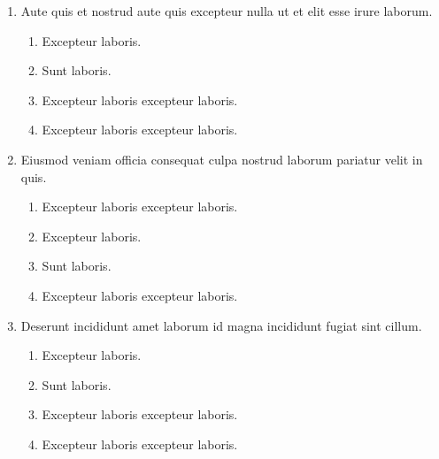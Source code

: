 \documentclass[a4paper,12pt]{article}
\begin{document}
\begin{enumerate}[label=\textbf{\arabic*.}]
\begin{multicols}{2}
\end{multicols}
\item Aute quis et nostrud aute quis excepteur nulla ut et elit esse irure laborum.
\begin{multicols}{2}
	\begin{enumerate}
		\item  Excepteur laboris.
    
		\item  Sunt laboris.
    
		\item  Excepteur laboris excepteur laboris.
  
		\item  Excepteur laboris excepteur laboris.
    
	\end{enumerate}

\end{multicols}
\item Eiusmod veniam officia consequat culpa nostrud laborum pariatur velit in quis.
\begin{multicols}{2}
	\begin{enumerate}
		\item  Excepteur laboris excepteur laboris.
    
		\item  Excepteur laboris.
    
		\item  Sunt laboris.
    
		\item  Excepteur laboris excepteur laboris.
  
	\end{enumerate}

\end{multicols}
\item Deserunt incididunt amet laborum id magna incididunt fugiat sint cillum.
\begin{multicols}{2}
	\begin{enumerate}
		\item  Excepteur laboris.
    
		\item  Sunt laboris.
    
		\item  Excepteur laboris excepteur laboris.
    
		\item  Excepteur laboris excepteur laboris.
  
	\end{enumerate}


\end{multicols}
\end{enumerate}
\end{document}
